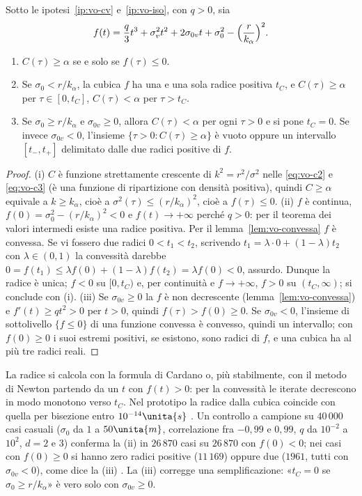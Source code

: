 \begin{proposizione}\label{prop:vo-tc}
Sotto le ipotesi~\ref{ip:vo-cv} e~\ref{ip:vo-iso}, con $q>0$, sia
\[f(t)=\frac q3t^3+\sigma_v^2t^2+2\sigma_{0v}t+\sigma_0^2-\Bigl(\frac r{k_\alpha}\Bigr)^2 .\]
\begin{enumerate}[label=(\roman*)]
\item $C(\tau)\ge\alpha$ se e solo se $f(\tau)\le0$.
\item Se $\sigma_0<r/k_\alpha$, la cubica $f$ ha una e una sola radice positiva $t_C$, e $C(\tau)\ge\alpha$ per $\tau\in[0,t_C]$, $C(\tau)<\alpha$ per $\tau>t_C$.
\item Se $\sigma_0\ge r/k_\alpha$ e $\sigma_{0v}\ge0$, allora $C(\tau)<\alpha$ per ogni $\tau>0$ e si pone $t_C=0$. Se invece $\sigma_{0v}<0$, l'insieme $\{\tau>0:C(\tau)\ge\alpha\}$ è vuoto oppure un intervallo $[t_-,t_+]$ delimitato dalle due radici positive di $f$.
\end{enumerate}
\end{proposizione}
\begin{proof}
(i) $C$ è funzione strettamente crescente di $k^2=r^2/\sigma^2$ nelle \eqref{eq:vo-c2} e \eqref{eq:vo-c3} (è una funzione di ripartizione con densità positiva), quindi $C\ge\alpha$ equivale a $k\ge k_\alpha$, cioè a $\sigma^2(\tau)\le(r/k_\alpha)^2$, cioè a $f(\tau)\le0$.
(ii) $f$ è continua, $f(0)=\sigma_0^2-(r/k_\alpha)^2<0$ e $f(t)\to+\infty$ perché $q>0$: per il teorema dei valori intermedi esiste una radice positiva. Per il lemma~\ref{lem:vo-convessa} $f$ è convessa. Se vi fossero due radici $0<t_1<t_2$, scrivendo $t_1=\lambda\cdot0+(1-\lambda)t_2$ con $\lambda\in(0,1)$ la convessità darebbe $0=f(t_1)\le\lambda f(0)+(1-\lambda)f(t_2)=\lambda f(0)<0$, assurdo. Dunque la radice è unica; $f<0$ su $[0,t_C)$ e, per continuità e $f\to+\infty$, $f>0$ su $(t_C,\infty)$; si conclude con (i).
(iii) Se $\sigma_{0v}\ge0$ la $f$ è non decrescente (lemma~\ref{lem:vo-convessa}) e $f'(t)\ge qt^2>0$ per $t>0$, quindi $f(\tau)>f(0)\ge0$. Se $\sigma_{0v}<0$, l'insieme di sottolivello $\{f\le0\}$ di una funzione convessa è convesso, quindi un intervallo; con $f(0)\ge0$ i suoi estremi positivi, se esistono, sono radici di $f$, e una cubica ha al più tre radici reali.
\end{proof}

La radice si calcola con la formula di Cardano o, più stabilmente, con il metodo di Newton partendo da un $t$ con $f(t)>0$: per la convessità le iterate decrescono in modo monotono verso $t_C$. Nel prototipo la radice dalla cubica coincide con quella per bisezione entro $10^{-14}\unita{s}$ . Un controllo a campione su $40\,000$ casi casuali ($\sigma_0$ da $1$ a $50\unita{m}$, correlazione fra $-0{,}99$ e $0{,}99$, $q$ da $10^{-2}$ a $10^2$, $d=2$ e $3$) conferma la (ii) in $26\,870$ casi su $26\,870$ con $f(0)<0$; nei casi con $f(0)\ge0$ si hanno zero radici positive ($11\,169$) oppure due ($1961$, tutti con $\sigma_{0v}<0$), come dice la (iii) . La (iii) corregge una semplificazione: «$t_C=0$ se $\sigma_0\ge r/k_\alpha$» è vero solo con $\sigma_{0v}\ge0$.

